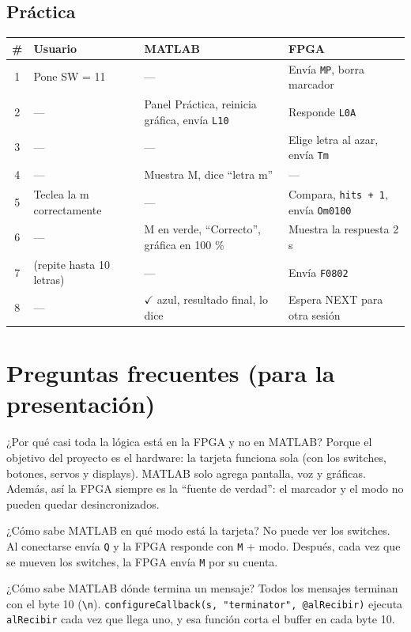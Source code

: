 \documentclass[11pt,a4paper]{article}
\newcommand{\cod}[1]{\texttt{#1}}
\begin{document}
\subsection{Práctica}
\begin{longtable}{c p{4.2cm} p{4.6cm} p{4.4cm}}
\toprule
\textbf{\#} & \textbf{Usuario} & \textbf{MATLAB} & \textbf{FPGA} \\
\midrule
\endhead
1 & Pone SW = 11 & --- & Envía \cod{MP}, borra marcador \\
2 & --- & Panel Práctica, reinicia gráfica, envía \cod{L10} & Responde \cod{L0A} \\
3 & --- & --- & Elige letra al azar, envía \cod{Tm} \\
4 & --- & Muestra M, dice ``letra m'' & --- \\
5 & Teclea la m correctamente & --- & Compara, \cod{hits + 1}, envía \cod{Om0100} \\
6 & --- & M en verde, ``Correcto'', gráfica en 100 \% & Muestra la respuesta 2 s \\
7 & (repite hasta 10 letras) & --- & Envía \cod{F0802} \\
8 & --- & $\checkmark$ azul, resultado final, lo dice & Espera NEXT para otra sesión \\
\bottomrule
\end{longtable}

\section{Preguntas frecuentes (para la presentación)}

\begin{pregunta}{¿Por qué casi toda la lógica está en la FPGA y no en MATLAB?}
Porque el objetivo del proyecto es el hardware: la tarjeta funciona sola (con los
switches, botones, servos y displays). MATLAB solo agrega pantalla, voz y gráficas.
Además, así la FPGA siempre es la ``fuente de verdad'': el marcador y el modo no
pueden quedar desincronizados.
\end{pregunta}

\begin{pregunta}{¿Cómo sabe MATLAB en qué modo está la tarjeta?}
No puede ver los switches. Al conectarse envía \cod{Q} y la FPGA responde con
\cod{M} + modo. Después, cada vez que se mueven los switches, la FPGA envía
\cod{M} por su cuenta.
\end{pregunta}

\begin{pregunta}{¿Cómo sabe MATLAB dónde termina un mensaje?}
Todos los mensajes terminan con el byte 10 (\cod{\textbackslash n}).
\cod{configureCallback(s, "terminator", @alRecibir)} ejecuta \cod{alRecibir} cada
vez que llega uno, y esa función corta el buffer en cada byte 10.
\end{pregunta}
\end{document}
